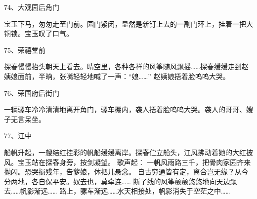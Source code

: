 74、大观园后角门\par
宝玉下马，匆匆走至门前。园门紧闭，显然是新钉上去的一副门环上，挂着一把大铜锁。宝玉叹了口气。

75、荣禧堂前\par
探春慢慢抬头朝天上看去。晴空里，各种各祥的风筝随风飘摇……探春缓缓走到赵姨娘面前，半晌，张嘴轻轻地喊了一声：“娘……”
赵姨娘捂着脸呜呜大哭。

76、荣国府后街门\par
一辆骡车冷冷清清地离开角门，骡车棚内，袭人捂着脸呜呜大哭。袭人的哥哥、嫂子无言呆坐。

77、江中\par
船帆升起，一艘结红挂彩的帆船缓缓离岸。探春伫立船头，江风拂动着她的大红披风。宝玉站在探春身旁，按剑凝望。
歌声起：
一帆风雨路三千，把骨肉家园齐来抛闪。恐哭损残年，告爹娘，休把儿悬念。
自古穷通皆有定，离合岂无缘？从今分两地，各自保平安。奴去也，莫牵连……
断了线的风筝颤颤悠悠地向天边飘去……帆影渐远……
路上，骡车渐远……水天相接处，帆影消失于空茫之中……

